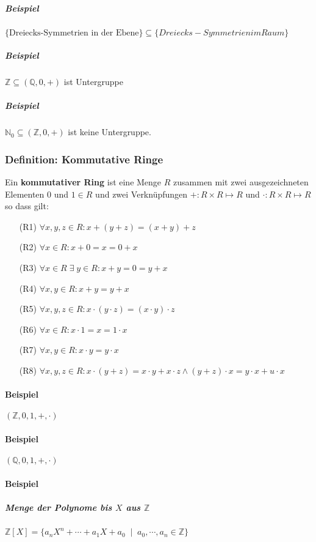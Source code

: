 \documentclass[14pt,a4paper]{article}
\newcommand{\N}{\ensuremath{\mathbb{N}}}
\newcommand{\Z}{\ensuremath{\mathbb{Z}}}
\newcommand{\Q}{\ensuremath{\mathbb{Q}}}
\newcommand{\Nzero}{\ensuremath{\N_0}}
\begin{document}
    \subparagraph{Beispiel}
    $\{\text{Dreiecks-Symmetrien in der Ebene}\} \subseteq \{Dreiecks-Symmetrien im
    Raum\}$
    \subparagraph{Beispiel}
    $\Z \subseteq (\Q, 0, +)$ ist Untergruppe

    \subparagraph{Beispiel}
    $\Nzero \subseteq (\Z, 0, +)$ ist keine Untergruppe.

    \subsubsection{Definition: Kommutative Ringe}
    Ein \textbf{kommutativer Ring} ist eine Menge $R$ zusammen mit zwei
    ausgezeichneten Elementen $0$ und $1 \in R$ und zwei Verknüpfungen $ + : R \times R \mapsto R$ und $\cdot : R \times R \mapsto R$ so dass gilt:

    \begin{enumerate}
      \item[(R1)] $ \forall x,y,z \in R:   x + (y + z) = (x + y) + z $
      \item[(R2)] $ \forall x \in R: x + 0 = x = 0 + x $
      \item[(R3)] $ \forall x \in R \;\exists\; y \in R : x + y = 0 = y + x $
      \item[(R4)] $ \forall x,y \in R : x + y = y + x $
      \item[(R5)] $ \forall x,y,z \in R : x \cdot (y \cdot z) = (x \cdot y) \cdot
   	 z $
      \item[(R6)] $ \forall x \in R : x \cdot 1 = x = 1 \cdot x $
      \item[(R7)] $ \forall x,y \in R: x \cdot y = y \cdot x $
      \item[(R8)] $ \forall x,y,z \in R : x \cdot (y + z) = x \cdot y + x \cdot z
   	 \land ( y + z) \cdot x = y \cdot x + u \cdot x $
    \end{enumerate}

    \paragraph{Beispiel}
    $(\Z, 0, 1, +, \cdot)$

    \paragraph{Beispiel}
    $(\Q, 0, 1, +, \cdot)$


    \paragraph{Beispiel}
    \subparagraph{Menge der Polynome bis $X$ aus $\Z$}
    $ \Z [ X ] = \{ a_nX^n + \dotsb + a_1X+a_0 \;\;|\;\; a_0, \dotsb, a_n \in \Z
    \} $
\end{document}
